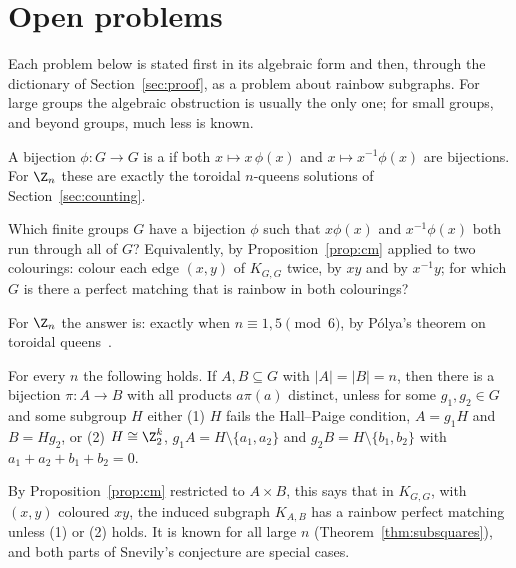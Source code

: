 \section{Open problems}\label{sec:open}

Each problem below is stated first in its algebraic form and then, through the dictionary of Section~\ref{sec:proof}, as a problem about rainbow subgraphs. For large groups the algebraic obstruction is usually the only one; for small groups, and beyond groups, much less is known.


A bijection $\phi\colon G\to G$ is a  if both $x\mapsto x\,\phi(x)$ and $x\mapsto x^{-1}\phi(x)$ are bijections. For $\Z_n$ these are exactly the toroidal $n$-queens solutions of Section~\ref{sec:counting}.

\begin{problem}\label{prob:strong}
Which finite groups $G$ have a bijection $\phi$ such that $x\phi(x)$ and $x^{-1}\phi(x)$ both run through all of $G$? Equivalently, by Proposition~\ref{prop:cm} applied to two colourings: colour each edge $(x,y)$ of $K_{G,G}$ twice, by $xy$ and by $x^{-1}y$; for which $G$ is there a perfect matching that is rainbow in both colourings?
\end{problem}

For $\Z_n$ the answer is: exactly when $n\equiv1,5\pmod6$, by P\'olya's theorem on toroidal queens~\cite{pol1918}.


\begin{conjecture}\label{conj:mp-every-n}
For every $n$ the following holds. If $A,B\subseteq G$ with $|A|=|B|=n$, then there is a bijection $\pi\colon A\to B$ with all products $a\pi(a)$ distinct, unless for some $g_1,g_2\in G$ and some subgroup $H$ either (1) $H$ fails the Hall--Paige condition, $A=g_1H$ and $B=Hg_2$, or (2) $H\cong\Z_2^k$, $g_1A=H\setminus\{a_1,a_2\}$ and $g_2B=H\setminus\{b_1,b_2\}$ with $a_1+a_2+b_1+b_2=0$.
\end{conjecture}

By Proposition~\ref{prop:cm} restricted to $A\times B$, this says that in $K_{G,G}$, with $(x,y)$ coloured $xy$, the induced subgraph $K_{A,B}$ has a rainbow perfect matching unless (1) or (2) holds. It is known for all large $n$ (Theorem~\ref{thm:subsquares}), and both parts of Snevily's conjecture are special cases.

